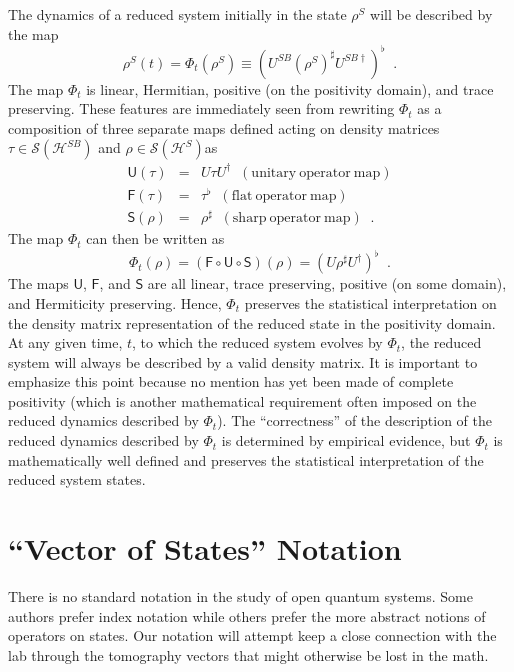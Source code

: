 The dynamics of a reduced system initially in the state $\rho^S$ will be described by the map
$$
\rho^S(t) = \Phi_t(\rho^S) \equiv \left( U^{SB} (\rho^{S})^\sharp U^{SB\dagger}\right)^\flat\;\;.
$$
The map $\Phi_t$ is linear, Hermitian, positive (on the positivity domain), and trace preserving.  These features are immediately seen from rewriting $\Phi_t$ as a composition of three separate maps defined acting on density matrices $\tau\in\mathcal{S}(\mathcal{H}^{SB})$ and $\rho\in\mathcal{S}(\mathcal{H}^{S})$as
\begin{eqnarray*}
\mathsf{U}(\tau) &=& U \tau U^\dagger\;\;\mathrm{(unitary\ operator\ map)}\\
\mathsf{F}(\tau) &=& \tau^\flat\;\;\mathrm{(flat\ operator\ map)}\\
\mathsf{S}(\rho) &=& \rho^\sharp\;\;\mathrm{(sharp\ operator\ map)}\;\;.
\end{eqnarray*}
The map $\Phi_t$ can then be written as
$$
\Phi_t(\rho) = \left(\mathsf{F} \circ \mathsf{U} \circ \mathsf{S}\right)(\rho) = \left(U\rho^\sharp U^\dagger\right)^\flat\;\;.
$$
The maps $\mathsf{U}$, $\mathsf{F}$, and $\mathsf{S}$ are all linear, trace preserving, positive (on some domain), and Hermiticity preserving.  Hence, $\Phi_t$ preserves the statistical interpretation on the density matrix representation of the reduced state in the positivity domain.  At any given time, $t$, to which the reduced system evolves by $\Phi_t$, the reduced system will always be described by a valid density matrix.  It is important to emphasize this point because no mention has yet been made of complete positivity (which is another mathematical requirement often imposed on the reduced dynamics described by $\Phi_t$).  The ``correctness'' of the description of the reduced dynamics described by $\Phi_t$ is determined by empirical evidence, but $\Phi_t$ is mathematically well defined and preserves the statistical interpretation of the reduced system states.

\section{``Vector of States'' Notation}
\label{sec:notation}
 
There is no standard notation in the study of open quantum systems.  Some authors prefer index notation while others prefer the more abstract notions of operators on states.  Our notation will attempt keep a close connection with the lab through the tomography vectors that might otherwise be lost in the math.

